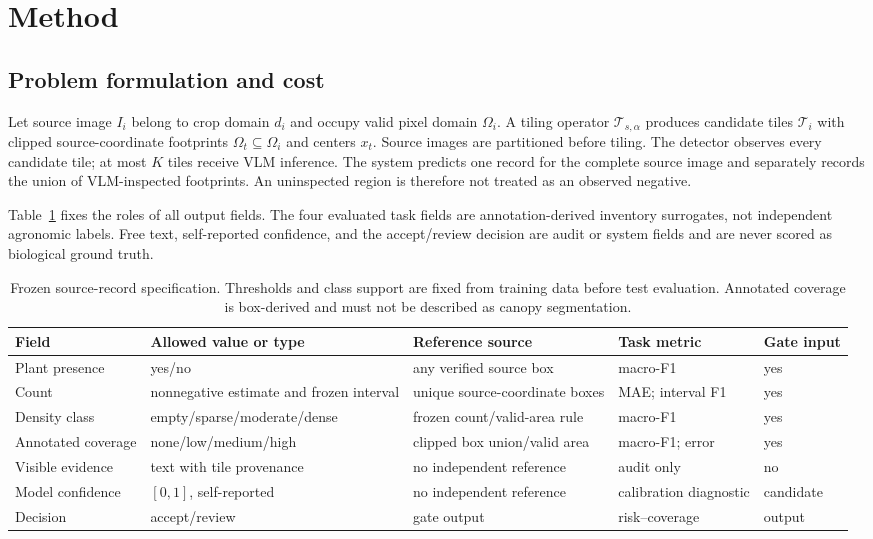\section{Method}
\subsection{Problem formulation and cost}
Let source image $I_i$ belong to crop domain $d_i$ and occupy valid pixel domain $\Omega_i$. A tiling operator $\mathcal{T}_{s,\alpha}$ produces candidate tiles $\mathcal{T}_i$ with clipped source-coordinate footprints $\Omega_t\subseteq\Omega_i$ and centers $x_t$. Source images are partitioned before tiling. The detector observes every candidate tile; at most $K$ tiles receive VLM inference. The system predicts one record for the complete source image and separately records the union of VLM-inspected footprints. An uninspected region is therefore not treated as an observed negative.

Table~\ref{tab:schema} fixes the roles of all output fields. The four evaluated task fields are annotation-derived inventory surrogates, not independent agronomic labels. Free text, self-reported confidence, and the accept/review decision are audit or system fields and are never scored as biological ground truth.

\begin{table}[t]
\centering
\wacvtablefont
\caption{Frozen source-record specification. Thresholds and class support are fixed from training data before test evaluation. Annotated coverage is box-derived and must not be described as canopy segmentation.}
\label{tab:schema}
\setlength{\tabcolsep}{4.5pt}
\begin{tabular}{lllll}
\toprule
Field & Allowed value or type & Reference source & Task metric & Gate input \\
\midrule
Plant presence & yes/no & any verified source box & macro-F1 & yes \\
Count & nonnegative estimate and frozen interval & unique source-coordinate boxes & MAE; interval F1 & yes \\
Density class & empty/sparse/moderate/dense & frozen count/valid-area rule & macro-F1 & yes \\
Annotated coverage & none/low/medium/high & clipped box union/valid area & macro-F1; error & yes \\
Visible evidence & text with tile provenance & no independent reference & audit only & no \\
Model confidence & $[0,1]$, self-reported & no independent reference & calibration diagnostic & candidate \\
Decision & accept/review & gate output & risk--coverage & output \\
\bottomrule
\end{tabular}
\end{table}

